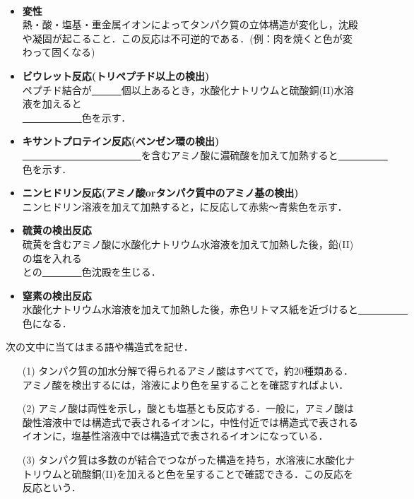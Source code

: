 \documentclass[a4paper,12pt]{ltjsarticle}
\begin{document}
　\\
\begin{itemize}
    \item \textbf{変性}\\
    熱・酸・塩基・重金属イオンによってタンパク質の立体構造が変化し，沈殿や凝固が起こること．この反応は不可逆的である．(例：肉を焼くと色が変わって固くなる)\\
    \item  \textbf{ビウレット反応(トリペプチド以上の検出)}\\
    ペプチド結合が\underline{　　　}個以上あるとき，水酸化ナトリウムと硫酸銅(II)水溶液を加えると\\[10pt]\underline{　　　　　　}色を示す．\\
    \item  \textbf{キサントプロテイン反応(ベンゼン環の検出)}\\[10pt]
    \underline{　　　　　　　　　　　　}を含むアミノ酸に濃硫酸を加えて加熱すると\underline{　　　　　}色を示す．\\
    \item  \textbf{ニンヒドリン反応(アミノ酸orタンパク質中のアミノ基の検出)}\\
    ニンヒドリン溶液を加えて加熱すると，に反応して赤紫〜青紫色を示す．\\
    \item  \textbf{硫黄の検出反応}\\
    硫黄を含むアミノ酸に水酸化ナトリウム水溶液を加えて加熱した後，鉛(II)の塩を入れる\\[10pt]との\underline{　　　　}色沈殿を生じる．\\
    \item \textbf{ 窒素の検出反応}\\
    水酸化ナトリウム水溶液を加えて加熱した後，赤色リトマス紙を近づけると\underline{　　　　　}色になる．
\end{itemize}
\newpage
\begin{que}
    次の文中に当てはまる語や構造式を記せ．
    \begin{itemize}
        \item [(1)]タンパク質の加水分解で得られるアミノ酸はすべてで，約20種類ある．アミノ酸を検出するには，溶液により色を呈することを確認すればよい．\\
        \item [(2)]アミノ酸は両性を示し，酸とも塩基とも反応する．一般に，アミノ酸は酸性溶液中では構造式で表されるイオンに，中性付近では構造式で表されるイオンに，塩基性溶液中では構造式で表されるイオンになっている．\\
    \item[(3)]タンパク質は多数のが結合でつながった構造を持ち，水溶液に水酸化ナトリウムと硫酸銅(II)を加えると色を呈することで確認できる．この反応を反応という．
    \end{itemize}
\end{que}
\end{document}
